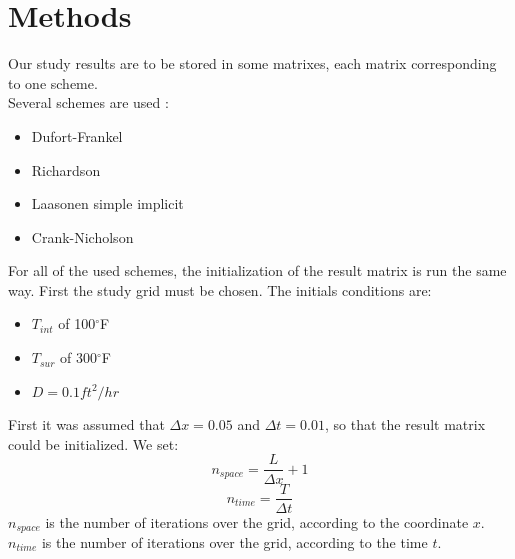\documentclass{article}
\begin{document}
    \section{Methods}
        Our study results are to be stored in some matrixes, each matrix corresponding to one scheme.\\
        Several schemes are used :
        \begin{itemize}
            \item{Dufort-Frankel}
            \item{Richardson}
            \item{Laasonen simple implicit}
            \item{Crank-Nicholson}
        \end{itemize}
        For all of the used schemes, the initialization of the result matrix is run the same way.
        First the study grid must be chosen. The initials conditions are:
        \begin{itemize}
            \item{$T_{int}$ of 100$^{\circ}$F}
            \item{$T_{sur}$ of 300$^{\circ}$F}
            \item{$D = 0.1 ft^{2}/hr$}
        \end{itemize}
        First it was assumed that $\Delta x = 0.05$ and $\Delta t = 0.01$,
        so that the result matrix could be initialized.
        We set:
        \begin{equation}
            n_{space} = \frac{L}{\Delta x} + 1
        \end{equation}
        \begin{equation}
            n_{time} = \frac{T}{\Delta t}
        \end{equation}
        $n_{space}$ is the number of iterations over the grid, according to the coordinate $x$. \\
        $n_{time}$ is the number of iterations over the grid, according to the time $t$. \\
        
\end{document}
